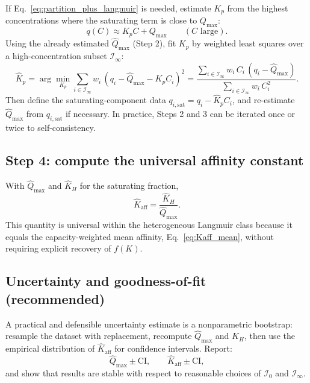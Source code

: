 \documentclass[12pt]{article}
\begin{document}
	If Eq.~\eqref{eq:partition_plus_langmuir} is needed, estimate $K_p$ from the highest concentrations where the saturating term is close to $Q_{\max}$:
	\begin{equation}
		q(C) \approx K_p C + Q_{\max}
		\qquad (C \text{ large}).
		\label{eq:highC_partition}
	\end{equation}
	Using the already estimated $\widehat{Q}_{\max}$ (Step 2), fit $K_p$ by weighted least squares over a high-concentration subset $\mathcal{I}_\infty$:
	\begin{equation}
		\widehat{K}_p =
		\arg\min_{K_p}\sum_{i\in\mathcal{I}_\infty} w_i\,(q_i - \widehat{Q}_{\max} - K_p C_i)^2
		=
		\frac{\sum_{i\in\mathcal{I}_\infty} w_i\,C_i\,(q_i-\widehat{Q}_{\max})}{\sum_{i\in\mathcal{I}_\infty} w_i\,C_i^2}.
		\label{eq:Kp_fit}
	\end{equation}
	Then define the saturating-component data $q_{i,\mathrm{sat}} = q_i - \widehat{K}_p C_i$, and re-estimate $\widehat{Q}_{\max}$ from $q_{i,\mathrm{sat}}$ if necessary. In practice, Steps 2 and 3 can be iterated once or twice to self-consistency.
	
	\subsection{Step 4: compute the universal affinity constant}
	
	With $\widehat{Q}_{\max}$ and $\widehat{K}_H$ for the saturating fraction,
	\begin{equation}
		\widehat{K}_{\mathrm{aff}} = \frac{\widehat{K}_H}{\widehat{Q}_{\max}}.
		\label{eq:Kaff_est}
	\end{equation}
	This quantity is universal within the heterogeneous Langmuir class because it equals the capacity-weighted mean affinity, Eq.~\eqref{eq:Kaff_mean}, without requiring explicit recovery of $f(K)$.
	
	\subsection{Uncertainty and goodness-of-fit (recommended)}
	
	A practical and defensible uncertainty estimate is a nonparametric bootstrap:
	resample the dataset with replacement, recompute $\widehat{Q}_{\max}$ and $\widehat{K}_H$, then use the empirical distribution of $\widehat{K}_{\mathrm{aff}}$ for confidence intervals. Report:
	\[
	\widehat{Q}_{\max}\pm \text{CI},\qquad
	\widehat{K}_{\mathrm{aff}}\pm \text{CI},
	\]
	and show that results are stable with respect to reasonable choices of $\mathcal{I}_0$ and $\mathcal{I}_\infty$.
	
\end{document}
